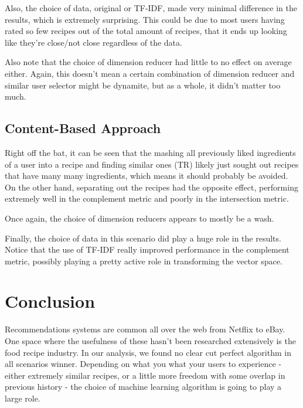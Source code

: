 \documentclass[11pt]{article}
\begin{document}
Also, the choice of data, original or TF-IDF, made very minimal difference in the results, which is extremely surprising. This could be due to most users having rated so few recipes out of the total amount of recipes, that it ends up looking like they're close/not close regardless of the data. 

Also note that the choice of dimension reducer had little to no effect on average either. Again, this doesn't mean a certain combination of dimension reducer and similar user selector might be dynamite, but as a whole, it didn't matter too much.

\subsection{Content-Based Approach}

Right off the bat, it can be seen that the mashing all previously liked ingredients of a user into a recipe and finding similar ones (TR) likely just sought out recipes that have many many ingredients, which means it should probably be avoided. On the other hand, separating out the recipes had the opposite effect, performing extremely well in the complement metric and poorly in the intersection metric.

Once again, the choice of dimension reducers appears to mostly be a wash.

Finally, the choice of data in this scenario did play a huge role in the results. Notice that the use of TF-IDF really improved performance in the complement metric, possibly playing a pretty active role in transforming the vector space.  

\section{Conclusion}

Recommendations systems are common all over the web from Netflix to eBay. One space where the usefulness of these hasn't been researched extensively is the food recipe industry. In our analysis, we found no clear cut perfect algorithm in all scenarios winner. Depending on what you what your users to experience - either extremely similar recipes, or a little more freedom with some overlap in previous history - the choice of machine learning algorithm is going to play a large role. 


\end{document}
